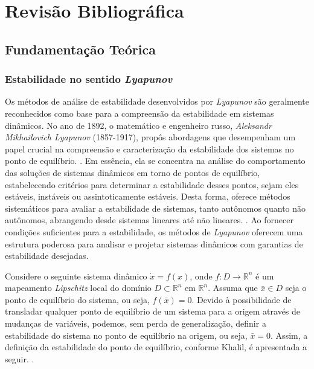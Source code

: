 \chapter{Revisão Bibliográfica} \label{cap2}

\section{Fundamentação Teórica}

\subsection{Estabilidade no sentido \textit{Lyapunov}}

Os métodos de análise de estabilidade desenvolvidos por \textit{Lyapunov} são geralmente reconhecidos como base para a compreensão da estabilidade em sistemas dinâmicos. No ano de 1892, o matemático e engenheiro russo, \textit{Aleksandr Mikhailovich Lyapunov} (1857-1917), propôs abordagens que desempenham um papel crucial na compreensão e caracterização da estabilidade dos sistemas no ponto de equilíbrio. \cite{lyapunov1892}. Em essência, ela se concentra na análise do comportamento das soluções de sistemas dinâmicos em torno de pontos de equilíbrio, estabelecendo critérios para determinar a estabilidade desses pontos, sejam eles estáveis, instáveis ou assintoticamente estáveis. Desta forma, oferece métodos sistemáticos para avaliar a estabilidade de sistemas, tanto autônomos quanto não autônomos, abrangendo desde sistemas lineares até não lineares. \cite{khalil2002}. Ao fornecer condições suficientes para a estabilidade, os métodos de \textit{Lyapunov} oferecem uma estrutura poderosa para analisar e projetar sistemas dinâmicos com garantias de estabilidade desejadas.

Considere o seguinte sistema dinâmico $\dot{x} = f(x)$, onde $f: D \rightarrow \mathbb{R}^n$ é um mapeamento \textit{Lipschitz} local do domínio $D \subset \mathbb{R}^n$ em $\mathbb{R}^n$. Assuma que $\bar{x} \in D$ seja o ponto de equilíbrio do sistema, ou seja, $f(\bar{x}) = 0$. Devido à possibilidade de transladar qualquer ponto de equilíbrio de um sistema para a origem através de mudanças de variáveis, podemos, sem perda de generalização, definir a estabilidade do sistema no ponto de equilíbrio na origem, ou seja, $\bar{x} = 0$. Assim, a definição da estabilidade do ponto de equilíbrio, conforme Khalil, é apresentada a seguir. \cite{khalil2002}.

